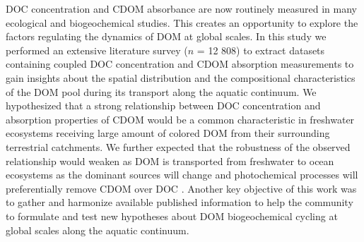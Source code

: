 DOC concentration and CDOM absorbance are now routinely measured in many ecological and biogeochemical studies. This creates an opportunity to explore the factors regulating the dynamics of DOM at global scales. In this study we performed an extensive literature survey ($n$ = 12 808) to extract datasets containing coupled DOC concentration and CDOM absorption measurements to gain insights about the spatial distribution and the compositional characteristics of the DOM pool during its transport along the aquatic continuum. We hypothesized that a strong relationship between DOC concentration and absorption properties of CDOM would be a common characteristic in freshwater ecosystems receiving large amount of colored DOM from their surrounding terrestrial catchments. We further expected that the robustness of the observed relationship would weaken as DOM is transported from freshwater to ocean ecosystems as the dominant sources will change and photochemical processes will preferentially remove CDOM over DOC \citep{Vahatalo2004}. Another key objective of this work was to gather and harmonize available published information to help the community to formulate and test new hypotheses about DOM biogeochemical cycling at global scales along the aquatic continuum.
